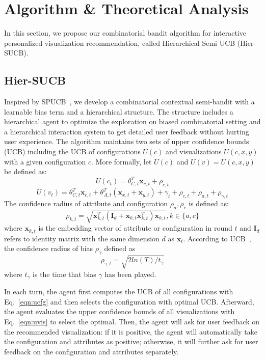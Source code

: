 
\section{Algorithm \& Theoretical Analysis}
In this section, we propose our combinatorial bandit algorithm for interactive personalized visualization recommendation, called Hierarchical Semi UCB (Hier-SUCB).

\subsection{Hier-SUCB}

Inspired by SPUCB~\cite{peng2019practical}, we develop a combinatorial contextual semi-bandit with a learnable bias term and a hierarchical structure. The structure includes a hierarchical agent to optimize the exploration on biased combinatorial setting and a hierarchical interaction system to get detailed user feedback without hurting user experience. The algorithm maintains two sets of upper confidence bounds (UCB) including the UCB of configurations $U(c)$ and visualizations $U(c,x,y)$ with a given configuration $c$. More formally, let $U(c)$ and $U(v)=U(c,x,y)$ be defined as:
\begin{equation}
    U(c_t)=\theta_{C,t}^T \mathbf x_{c,t}+\rho_{c,t}
\label{eqn:ucfg}
\end{equation}
\begin{equation}
    U(v_t)=\theta_{C,t}^T \mathbf x_{c,t}+\theta_{A,t}^T (\mathbf x_{x,t}+\mathbf x_{y,t}) + \gamma_t + \rho_{c,t} +\rho_{a,t} +\rho_{\gamma,t}
\label{eqn:uvis}
\end{equation}
The confidence radius of attribute and configuration $\rho_a,\rho_c$ is defined as:
\begin{equation}
    \rho_{k,t}=\sqrt{\mathbf x_{k,t}^T(\mathbf I_d+\mathbf x_{k,t} \mathbf x_{k,t}^T) \mathbf x_{k,t}}, k\in\lbrace a,c \rbrace
    \label{eqn:rhoca}
\end{equation}
where $\mathbf{x}_{k,t}$ is the embedding vector of attribute or configuration in round $t$ and $\mathbf I_d$ refers to identity matrix with the same dimension $d$ as $\mathbf x_t$. According to UCB~\cite{auer2010ucb}, the confidence radius of bias $\rho_\gamma$ defined as
\begin{equation}
    \rho_{\gamma,t}=\sqrt{2ln(T) / t_\gamma}
    \label{eqn:rhobias}
\end{equation}
where $t_\gamma$ is the time that bias $\gamma$ has been played.

In each turn, the agent first computes the UCB of all configurations with Eq.~\ref{eqn:ucfg} and then selects the configuration with optimal UCB. 
Afterward, the agent evaluates the upper confidence bounds of all visualizations with Eq.~\ref{eqn:uvis} to select the optimal. Then, the agent will ask for user feedback on the recommended visualization: 
if it is positive, the agent will automatically take the configuration and attributes as positive; otherwise, it will further ask for user feedback on the configuration and attributes separately. 

